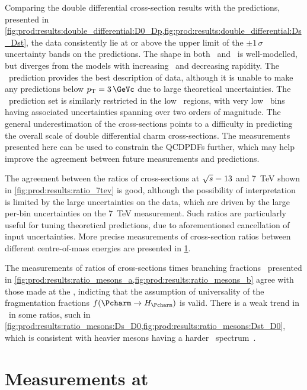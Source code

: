 Comparing the double differential cross-section results with the predictions,
presented in
\cref{fig:prod:results:double_differential:D0_Dp,fig:prod:results:double_differential:Ds_Dst},
the data consistently lie at or above the upper limit of the $\pm1\,\sigma$
uncertainty bands on the predictions.
The shape in both \pT\ and \rapidity\ is well-modelled, but diverges from the
models with increasing \pT\ and decreasing rapidity.
The \gmvfns\ prediction provides the best description of data, although it is
unable to make any predictions below $\pT = \SI{3}{\GeVc}$ due to large
theoretical uncertainties.
The \fonll\ prediction set is similarly restricted in the low \pT\ regions,
with very low \pT\ bins having associated uncertainties spanning over two
orders of magnitude.
The general underestimation of the cross-sections points to a difficulty in
predicting the overall scale of double differential charm cross-sections.
The measurements presented here can be used to constrain the \aclp{QCDPDF}
further, which may help improve the agreement between future measurements and
predictions.

The agreement between the ratios of cross-sections at $\sqrt{s} = 13$ and
\SI{7}{\TeV} shown in \cref{fig:prod:results:ratio_7tev} is good, although the
possibility of interpretation is limited by the large uncertainties on the
data, which are driven by the large per-bin uncertainties on the \SI{7}{\TeV}
measurement.
Such ratios are particularly useful for tuning theoretical predictions, due to
aforementioned cancellation of input uncertainties.
More precise measurements of cross-section ratios between different
centre-of-mass energies are presented in \cref{chap:prod:results:5tev}.

The measurements of ratios of cross-sections times branching fractions
\xsectimesbfrac\ presented in
\cref{fig:prod:results:ratio_mesons_a,fig:prod:results:ratio_mesons_b} agree
with those made at the \bfactories, indicting that the assumption of
universality of the fragmentation fractions $f(\cToHc)$ is valid.
There is a weak trend in \pT\ in some ratios, such in
\cref{fig:prod:results:ratio_mesons:Ds_D0,fig:prod:results:ratio_mesons:Dst_D0},
which is consistent with heavier mesons having a harder \pT\
spectrum~\cite{PDG2008}.

\section{Measurements at }
\label{chap:prod:results:5tev}

